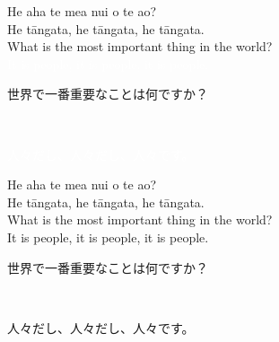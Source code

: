 \documentclass{beamer}
\begin{document}
   \begin{frame}
   
   \begin{center}
   
   \Large{He aha te mea nui o te ao? }\\
   \Large{He t\={a}ngata,  he t\={a}ngata, he t\={a}ngata.}\\
   
   
  \bigskip   
   \Large{What is the most important thing in the world?}\\   
   \textcolor{white}{
   \Large{It is people, it is people, it is people.}\\
   }
   
\bigskip   
   
   \Large{\begin{CJK}{UTF8}{min}世界で一番重要なことは何ですか？\end{CJK}}\\
   \Large{\begin{CJK}{UTF8}{min}\textcolor{white}{人々だし、人々だし、人々です。}\end{CJK}}
   
   \end{center}

  \end{frame}  
     \begin{frame}
   
   \begin{center}
   
   \Large{He aha te mea nui o te ao? }\\
   \Large{He t\={a}ngata,  he t\={a}ngata, he t\={a}ngata.}\\
   
   
  \bigskip   
   \Large{What is the most important thing in the world?}\\   
   \Large{It is people, it is people, it is people.}\\
   
\bigskip   
   
   \Large{\begin{CJK}{UTF8}{min}世界で一番重要なことは何ですか？\end{CJK}}\\
   \Large{\begin{CJK}{UTF8}{min}人々だし、人々だし、人々です。\end{CJK}}
   
   \end{center}

  \end{frame}  
  
\end{document}
